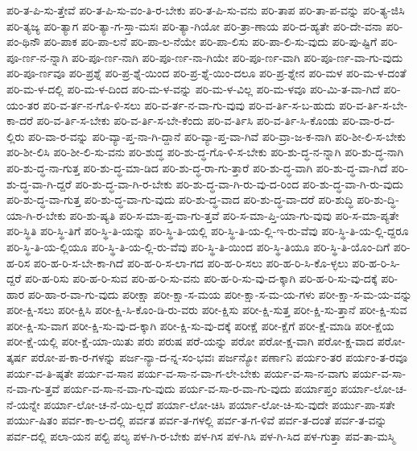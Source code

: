 {ಪರಿ-ತ-ಪಿ-ಸು-ತ್ತೇವೆ
ಪರಿ-ತ-ಪಿ-ಸು-ವಂ-ತಿ-ರ-ಬೇಕು
ಪರಿ-ತ-ಪಿ-ಸು-ವನು
ಪರಿ-ತಾಪ
ಪರಿ-ತಾ-ಪ-ವನ್ನು
ಪರಿ-ತ್ಯ-ಜಿಸಿ
ಪರಿ-ತ್ಯಜ್ಯ
ಪರಿ-ತ್ಯಾಗ
ಪರಿ-ತ್ಯಾ-ಗ-ಸ್ತಾ-ಮಸಃ
ಪರಿ-ತ್ಯಾ-ಗಿಯೋ
ಪರಿ-ತ್ರಾ-ಣಾಯ
ಪರಿ-ದ-ಹ್ಯತೇ
ಪರಿ-ದೇ-ವನಾ
ಪರಿ-ಪಂ-ಥಿನೌ
ಪರಿ-ಪಾಕ
ಪರಿ-ಪಾ-ಲನೆ
ಪರಿ-ಪಾ-ಲ-ನೆಯೇ
ಪರಿ-ಪಾ-ಲಿಸು
ಪರಿ-ಪಾ-ಲಿ-ಸು-ವುದು
ಪರಿ-ಪು-ಷ್ಟಿಗೆ
ಪರಿ-ಪೂ-ರ್ಣ-ನ-ನ್ನಾಗಿ
ಪರಿ-ಪೂ-ರ್ಣ-ನಾಗಿ
ಪರಿ-ಪೂ-ರ್ಣ-ನಾ-ಗಿಯೇ
ಪರಿ-ಪೂ-ರ್ಣ-ವಾಗಿ
ಪರಿ-ಪೂ-ರ್ಣ-ವಾ-ಗು-ವುದು
ಪರಿ-ಪೂ-ರ್ಣವೂ
ಪರಿ-ಪ್ರಶ್ನೆ
ಪರಿ-ಪ್ರ-ಶ್ನೆ-ಯಿಂದ
ಪರಿ-ಪ್ರ-ಶ್ನೆ-ಯಿಂ-ದಲೂ
ಪರಿ-ಪ್ರ-ಶ್ನೇನ
ಪರಿ-ಮಳ
ಪರಿ-ಮ-ಳ-ದಂತೆ
ಪರಿ-ಮ-ಳ-ದಲ್ಲಿ
ಪರಿ-ಮ-ಳ-ದಿಂದ
ಪರಿ-ಮ-ಳ-ವನ್ನು
ಪರಿ-ಮ-ಳ-ವಿಲ್ಲ
ಪರಿ-ಮ-ಳವೂ
ಪರಿ-ಮಿ-ತ-ವಾ-ಗಿದೆ
ಪರಿ-ಯಂ-ತರ
ಪರಿ-ವ-ರ್ತ-ನ-ಗೊ-ಳಿ-ಸಲು
ಪರಿ-ವ-ರ್ತ-ನ-ವಾ-ಗು-ವುವು
ಪರಿ-ವ-ರ್ತಿ-ಸ-ಬ-ಹುದು
ಪರಿ-ವ-ರ್ತಿ-ಸ-ಬೇ-ಕಾ-ದರೆ
ಪರಿ-ವ-ರ್ತಿ-ಸ-ಬೇಕು
ಪರಿ-ವ-ರ್ತಿ-ಸ-ಬೇ-ಕೆಂದು
ಪರಿ-ವ-ರ್ತಿಸಿ
ಪರಿ-ವ-ರ್ತಿ-ಸಿ-ಕೊಂಡು
ಪರಿ-ವಾ-ರ-ದ-ಲ್ಲಿರು
ಪರಿ-ವಾ-ರ-ವನ್ನು
ಪರಿ-ವ್ಯಾ-ಪ್ತ-ನಾ-ಗಿ-ದ್ದಾನೆ
ಪರಿ-ವ್ಯಾ-ಪ್ತ-ವಾ-ಗಿವೆ
ಪರಿ-ವ್ರಾ-ಜ-ಕ-ನಾಗಿ
ಪರಿ-ಶೀ-ಲಿ-ಸ-ಬೇಕು
ಪರಿ-ಶೀ-ಲಿಸಿ
ಪರಿ-ಶೀ-ಲಿ-ಸು-ವನು
ಪರಿ-ಶುದ್ಧ
ಪರಿ-ಶು-ದ್ಧ-ಗೊ-ಳಿ-ಸ-ಬೇಕು
ಪರಿ-ಶು-ದ್ಧ-ನ-ನ್ನಾಗಿ
ಪರಿ-ಶು-ದ್ಧ-ನಾಗಿ
ಪರಿ-ಶು-ದ್ಧ-ನಾ-ಗುತ್ತ
ಪರಿ-ಶು-ದ್ಧ-ಮಾ-ಡಿದ
ಪರಿ-ಶು-ದ್ಧ-ರಾ-ಗು-ತ್ತಾರೆ
ಪರಿ-ಶು-ದ್ಧ-ವಾಗಿ
ಪರಿ-ಶು-ದ್ಧ-ವಾ-ಗಿದೆ
ಪರಿ-ಶು-ದ್ಧ-ವಾ-ಗಿ-ದ್ದರೆ
ಪರಿ-ಶು-ದ್ಧ-ವಾ-ಗಿ-ರ-ಬೇಕು
ಪರಿ-ಶು-ದ್ಧ-ವಾ-ಗಿ-ರು-ವು-ದ-ರಿಂದ
ಪರಿ-ಶು-ದ್ಧ-ವಾ-ಗಿ-ರು-ವುದು
ಪರಿ-ಶು-ದ್ಧ-ವಾ-ಗುತ್ತ
ಪರಿ-ಶು-ದ್ಧ-ವಾ-ಗು-ವುದು
ಪರಿ-ಶು-ದ್ಧ-ವಾದ
ಪರಿ-ಶು-ದ್ಧ-ವಾ-ದರೆ
ಪರಿ-ಶುದ್ಧಿ
ಪರಿ-ಶು-ದ್ಧಿ-ಯಾ-ಗಿ-ರ-ಬೇಕು
ಪರಿ-ಶು-ಷ್ಯತಿ
ಪರಿ-ಸ-ಮಾ-ಪ್ತ-ವಾ-ಗು-ತ್ತವೆ
ಪರಿ-ಸ-ಮಾ-ಪ್ತಿ-ಯಾ-ಗು-ವುವು
ಪರಿ-ಸ-ಮಾ-ಪ್ಯತೇ
ಪರಿ-ಸ್ಥಿತಿ
ಪರಿ-ಸ್ಥಿ-ತಿಗೆ
ಪರಿ-ಸ್ಥಿ-ತಿ-ಯನ್ನು
ಪರಿ-ಸ್ಥಿ-ತಿ-ಯಲ್ಲಿ
ಪರಿ-ಸ್ಥಿ-ತಿ-ಯ-ಲ್ಲಿ-ಇ-ರು-ವೆವು
ಪರಿ-ಸ್ಥಿ-ತಿ-ಯ-ಲ್ಲಿ-ದ್ದರೂ
ಪರಿ-ಸ್ಥಿ-ತಿ-ಯ-ಲ್ಲಿಯೂ
ಪರಿ-ಸ್ಥಿ-ತಿ-ಯ-ಲ್ಲಿ-ರು-ವೆವು
ಪರಿ-ಸ್ಥಿ-ತಿ-ಯಿಂದ
ಪರಿ-ಸ್ಥಿ-ತಿಯೂ
ಪರಿ-ಸ್ಥಿ-ತಿ-ಯೊಂ-ದಿಗೆ
ಪರಿ-ಹ-ರಿಸ
ಪರಿ-ಹ-ರಿ-ಸ-ಬೇ-ಕಾ-ಗಿದೆ
ಪರಿ-ಹ-ರಿ-ಸ-ಲಾ-ಗದ
ಪರಿ-ಹ-ರಿ-ಸಲು
ಪರಿ-ಹ-ರಿ-ಸಿ-ಕೊ-ಳ್ಳಲು
ಪರಿ-ಹ-ರಿ-ಸಿ-ದ್ದರೆ
ಪರಿ-ಹ-ರಿಸು
ಪರಿ-ಹ-ರಿ-ಸುವ
ಪರಿ-ಹ-ರಿ-ಸು-ವನು
ಪರಿ-ಹ-ರಿ-ಸು-ವು-ದ-ಕ್ಕಾಗಿ
ಪರಿ-ಹ-ರಿ-ಸು-ವು-ದಕ್ಕೆ
ಪರಿ-ಹಾರ
ಪರಿ-ಹಾ-ರ-ವಾ-ಗು-ವುದು
ಪರೀಕ್ಷಾ
ಪರೀ-ಕ್ಷಾ-ಸ-ಮಯ
ಪರೀ-ಕ್ಷಾ-ಸ-ಮ-ಯ-ಗಳು
ಪರೀ-ಕ್ಷಾ-ಸ-ಮ-ಯ-ವನ್ನು
ಪರೀ-ಕ್ಷಿ-ಸಲು
ಪರೀ-ಕ್ಷಿಸಿ
ಪರೀ-ಕ್ಷಿ-ಸಿ-ಕೊಂ-ಡಿ-ರು-ವರು
ಪರೀ-ಕ್ಷಿಸು
ಪರೀ-ಕ್ಷಿ-ಸುತ್ತ
ಪರೀ-ಕ್ಷಿ-ಸು-ತ್ತಾನೆ
ಪರೀ-ಕ್ಷಿ-ಸುವ
ಪರೀ-ಕ್ಷಿ-ಸು-ವಾಗ
ಪರೀ-ಕ್ಷಿ-ಸು-ವು-ದ-ಕ್ಕಾಗಿ
ಪರೀ-ಕ್ಷಿ-ಸು-ವು-ದಕ್ಕೆ
ಪರೀಕ್ಷೆ
ಪರೀ-ಕ್ಷೆಗೆ
ಪರೀ-ಕ್ಷೆ-ಮಾಡಿ
ಪರೀ-ಕ್ಷೆಯ
ಪರೀ-ಕ್ಷೆ-ಯಲ್ಲಿ
ಪರೀ-ಕ್ಷೆ-ಯಾ-ಯಿತು
ಪರು
ಪರುಷ
ಪರೆ-ಯನ್ನು
ಪರೋ
ಪರೋ-ಕ್ಷ-ವಾಗಿ
ಪರೋ-ಕ್ಷ-ವಾದ
ಪರೋ-ತ್ಕರ್ಷ
ಪರೋ-ಪ-ಕಾ-ರ-ಗಳನ್ನು
ಪರ್ಜ-ನ್ಯಾ-ದ-ನ್ನ-ಸಂ-ಭವಃ
ಪರ್ಜನ್ಯೋ
ಪರ್ಣಾನಿ
ಪರ್ಯಂ-ತರ
ಪರ್ಯಂ-ತ-ರವೂ
ಪರ್ಯ-ವ-ತಿ-ಷ್ಠತೇ
ಪರ್ಯ-ವ-ಸಾನ
ಪರ್ಯ-ವ-ಸಾ-ನ-ವಾ-ಗ-ಲೇ-ಬೇಕು
ಪರ್ಯ-ವ-ಸಾ-ನ-ವಾಗು
ಪರ್ಯ-ವ-ಸಾ-ನ-ವಾ-ಗು-ತ್ತವೆ
ಪರ್ಯ-ವ-ಸಾ-ನ-ವಾ-ಗು-ವುದು
ಪರ್ಯ-ವ-ಸಾ-ರ-ವಾ-ಗು-ವುದು
ಪರ್ಯಾಪ್ತಂ
ಪರ್ಯಾ-ಲೋ-ಚ-ನೆ-ಯನ್ನೇ
ಪರ್ಯಾ-ಲೋ-ಚ-ನೆ-ಯಿ-ಲ್ಲದೆ
ಪರ್ಯಾ-ಲೋ-ಚಿಸಿ
ಪರ್ಯಾ-ಲೋ-ಚಿ-ಸು-ವುದೇ
ಪರ್ಯು-ಪಾ-ಸತೇ
ಪರ್ಯು-ಷಿತಂ
ಪರ್ವ-ಕಾ-ಲ-ದಲ್ಲಿ
ಪರ್ವತ
ಪರ್ವ-ತ-ಗಳಲ್ಲಿ
ಪರ್ವ-ತ-ಗ-ಳಿವೆ
ಪರ್ವ-ತ-ದಂತೆ
ಪರ್ವ-ತ-ವನ್ನು
ಪರ್ವ-ದಲ್ಲಿ
ಪಲಾ-ಯನ
ಪಲ್ಟಿ
ಪಲ್ಯ
ಪಳ-ಗಿ-ರ-ಬೇಕು
ಪಳ-ಗಿಸ
ಪಳ-ಗಿಸಿ
ಪಳ-ಗಿ-ಸಿದ
ಪಳ-ಗುತ್ತಾ
ಪವ-ತಾ-ಮಸ್ಮಿ
}
